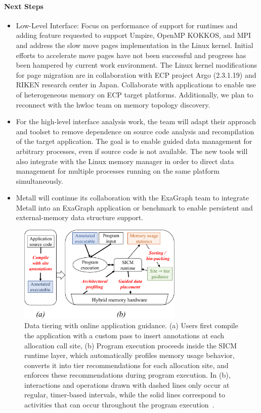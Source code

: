 \paragraph{Next Steps} \leavevmode 
\begin{itemize}
	\item  Low-Level Interface: Focus on performance of support for runtimes and adding feature requested to support Umpire, OpenMP KOKKOS, and MPI and address the slow move pages implementation in the Linux kernel. Initial efforts to accelerate move pages have not been successful and progress has been hampered by current work environment. The Linux kernel modifications for page migration are in collaboration with ECP project Argo (2.3.1.19) and RIKEN research center in Japan. Collaborate with applications to enable use of heterogeneous memory on ECP target platforms. Additionally, we plan to reconnect with the hwloc team on memory topology discovery.
	\item For the high-level interface analysis work, the team will adapt their approach and toolset to remove dependence on source code analysis and recompilation of the target application. The goal is to enable guided data management for arbitrary processes, even if source code is not available. The new tools will also integrate with the Linux memory manager in order to direct data management for multiple processes running on the same platform simultaneously.
	\item Metall will continue its collaboration with the ExaGraph team to integrate Metall into an ExaGraph application or benchmark to enable persistent and external-memory data structure support.   
\end{itemize}

\begin{figure}[htb]
	\centering
	\includegraphics[width=0.7\textwidth]{projects/2.3.1-PMR/2.3.1.16-SICM/sicm-online-diagram.pdf}
	\caption{
		Data tiering with online application guidance. (a) Users first compile the application with a custom pass to insert annotations at each allocation call site, (b) Program execution proceeds inside the SICM runtime layer, which automatically profiles memory usage behavior, converts it into tier recommendations for each allocation site, and enforces these recommendations during program execution. In (b), interactions and operations drawn with dashed lines only occur at regular, timer-based intervals, while the solid lines correspond to activities that can occur throughout the program execution~\cite{olson2021online}.
		\label{fig:sicm-online}
	}
\end{figure}
